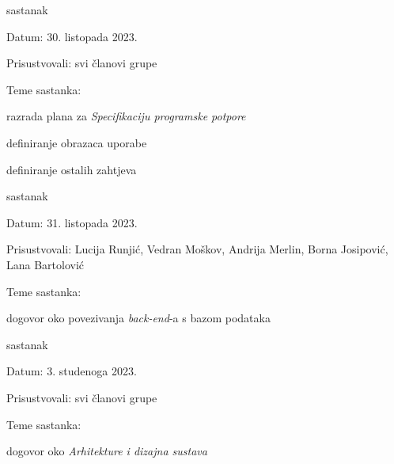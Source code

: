 \begin{packed_enum}
			\item sastanak
			
			\item[] \begin{packed_item}
				\item Datum: 30. listopada 2023.
				\item Prisustvovali: svi članovi grupe
				\item Teme sastanka:
				\begin{packed_item}
					\item razrada plana za \textit{Specifikaciju programske potpore}
					\item definiranje obrazaca uporabe
					\item definiranje ostalih zahtjeva
				\end{packed_item}
			\end{packed_item}
			
			\pagebreak
			
			\item sastanak
			
			\item[] \begin{packed_item}
				\item Datum: 31. listopada 2023.
				\item Prisustvovali: Lucija Runjić, Vedran Moškov, Andrija Merlin, Borna Josipović, Lana Bartolović
				\item Teme sastanka:
				\begin{packed_item}
					\item dogovor oko povezivanja \textit{back-end}-a s bazom podataka
				\end{packed_item}
			\end{packed_item}
			
			\item sastanak
			
			\item[] \begin{packed_item}
				\item Datum: 3. studenoga 2023.
				\item Prisustvovali: svi članovi grupe
				\item Teme sastanka:
				\begin{packed_item}
					\item dogovor oko \textit{Arhitekture i dizajna sustava}
				\end{packed_item}
			\end{packed_item}
			

\end{packed_enum}
